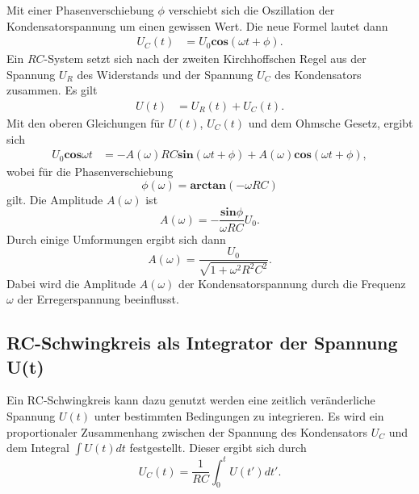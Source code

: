 \noindent Mit einer Phasenverschiebung $\phi$ verschiebt sich die Oszillation der Kondensatorspannung um einen gewissen Wert. Die neue Formel lautet dann 
\begin{align*} 
    U_{C}(t)&= U_{0} \mathbf{cos}(\omega t + \phi).
\end{align*}
Ein $RC$-System setzt sich nach der zweiten Kirchhoffschen Regel aus der Spannung $U_{R}$ des Widerstands und der Spannung $U_{C}$ des Kondensators zusammen.
Es gilt 
\begin{align*} 
    U(t) &= U_{R}(t) + U_{C}(t).
\end{align*}
Mit den oberen Gleichungen für $U(t)$, $U_{C}(t)$ und dem Ohmsche Gesetz, ergibt sich 
\begin{align*} 
U_{0} \mathbf{cos}\omega t &= -A(\omega) RC \mathbf{sin}(\omega t + \phi) + A(\omega) \mathbf{cos}(\omega t + \phi),  
\end{align*}
wobei für die Phasenverschiebung 
\begin{equation} 
\phi (\omega) = \mathbf{arctan}(-\omega RC) 
\label{eqn: phi}
\end{equation}
gilt. Die Amplitude $A(\omega)$ ist
\begin{equation} 
    A(\omega) = - \frac{\mathbf{sin}\phi}{\omega RC} U_{0}.
    \label{eqn: A1}
\end{equation}
Durch einige Umformungen ergibt sich dann 
\begin{equation}
A(\omega) = \frac{U_{0}}{\sqrt{1 + \omega^2 R^2 C^2}}.
\label{eqn: A2}
\end{equation}
Dabei wird die Amplitude $A(\omega)$ der Kondensatorspannung durch die Frequenz $\omega$ der Erregerspannung beeinflusst. 

\subsection{RC-Schwingkreis als Integrator der Spannung U(t)}
Ein RC-Schwingkreis kann dazu genutzt werden eine zeitlich veränderliche Spannung $U(t)$ unter bestimmten Bedingungen zu integrieren. 
Es wird ein proportionaler Zusammenhang zwischen der Spannung des Kondensators $U_{C}$ und dem Integral $\int U(t) dt$ festgestellt. Dieser ergibt sich durch 
\begin{equation}
    U_{C}(t) = \frac{1}{RC} \int_{0}^{t} U(t') dt'.
\end{equation} 



